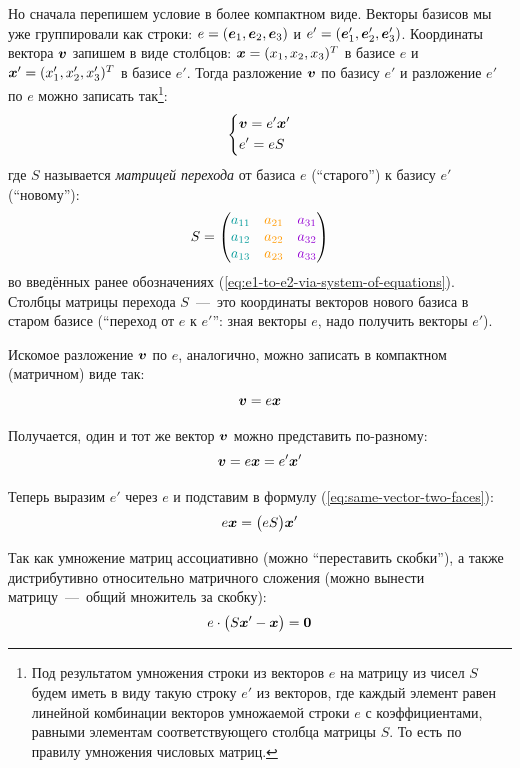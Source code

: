 \documentclass[a4paper,12pt]{article}
\begin{document}
  Но сначала перепишем условие в более компактном виде.
  Векторы базисов мы уже группировали как строки: $e \hm= (\bds e_1, \bds e_2, \bds e_3)$ и $e' \hm= (\bds e_1', \bds e_2', \bds e_3')$.
  Координаты вектора $\boldsymbol v$ запишем в виде столбцов: $\bds x \hm= (x_1, x_2, x_3)^T$ в базисе $e$ и $\bds x' \hm= (x_1', x_2', x_3')^T$ в базисе $e'$.
  Тогда разложение $\boldsymbol v$ по базису $e'$ и разложение $e'$ по $e$ можно записать так\footnote{Под результатом умножения строки из векторов $e$ на матрицу из чисел $S$ будем иметь в виду такую строку $e'$ из векторов, где каждый элемент равен линейной комбинации векторов умножаемой строки $e$ с коэффициентами, равными элементам соответствующего столбца матрицы $S$. То есть по правилу умножения числовых матриц.}:
  \[
    \left\{
      \begin{aligned}
        &\boldsymbol v = e' \boldsymbol x'\\
        &e' = e S
      \end{aligned}
    \right.
  \]
  где $S$ называется \emph{матрицей перехода} от базиса $e$ (``старого'') к базису $e'$ (``новому''):
  \[
    S = \begin{pmatrix}
      \textcolor{my-cyan}{a_{11}} & \textcolor{my-orange}{a_{21}} & \textcolor{my-purple}{a_{31}}\\
      \textcolor{my-cyan}{a_{12}} & \textcolor{my-orange}{a_{22}} & \textcolor{my-purple}{a_{32}}\\
      \textcolor{my-cyan}{a_{13}} & \textcolor{my-orange}{a_{23}} & \textcolor{my-purple}{a_{33}}
    \end{pmatrix}
  \]
  во введённых ранее обозначениях (\ref{eq:e1-to-e2-via-system-of-equations}).
  Столбцы матрицы перехода $S$~---~это координаты векторов нового базиса в старом базисе (``переход от $e$ к $e'$'': зная векторы $e$, надо получить векторы $e'$).
  
  Искомое разложение $\boldsymbol v$ по $e$, аналогично, можно записать в компактном (матричном) виде так:
  \[
    \boldsymbol v = e \boldsymbol x
  \]
  
  Получается, один и тот же вектор $\boldsymbol v$ можно представить по-разному:
  \begin{equation}\label{eq:same-vector-two-faces}
    \boldsymbol v = e \boldsymbol x = e' \boldsymbol x'
  \end{equation}
  
  Теперь выразим $e'$ через $e$ и подставим в формулу (\ref{eq:same-vector-two-faces}):
  \[
    e \boldsymbol x = \bigl(e S\bigr) \boldsymbol x'
  \]
  
  Так как умножение матриц ассоциативно (можно ``переставить скобки''), а также дистрибутивно относительно матричного сложения (можно вынести матрицу~---~общий множитель за скобку):
  \[
    e \cdot \bigl(S \boldsymbol x' - \boldsymbol x\bigr) = \boldsymbol 0
  \]
  
\end{document}
